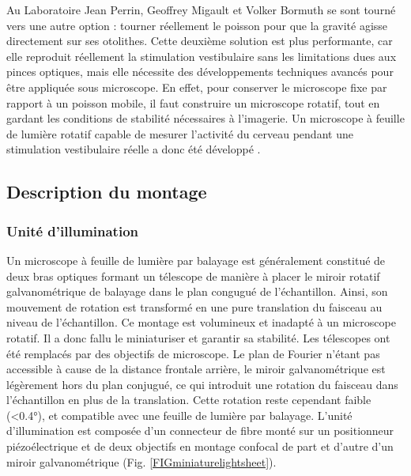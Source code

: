 Au Laboratoire Jean Perrin, Geoffrey Migault et Volker Bormuth se sont tourné vers une autre option : tourner réellement le poisson pour que la gravité agisse directement sur ses otolithes.
Cette deuxième solution est plus performante, car elle reproduit réellement la stimulation vestibulaire sans les limitations dues aux pinces optiques, mais elle nécessite des développements techniques avancés pour être appliquée sous microscope. En effet, pour conserver le microscope fixe par rapport à un poisson mobile, il faut construire un microscope rotatif, tout en gardant les conditions de stabilité nécessaires à l'imagerie. Un microscope à feuille de lumière rotatif capable de mesurer l'activité du cerveau pendant une stimulation vestibulaire réelle a donc été développé \cite{migault_whole-brain_2018}.

\subsection{Description du montage}

\subsubsection{Unité d'illumination}

Un microscope à feuille de lumière par balayage est généralement constitué de deux bras optiques formant un télescope de manière à placer le miroir rotatif galvanométrique de balayage dans le plan congugué de l'échantillon. Ainsi, son mouvement de rotation est transformé en une pure translation du faisceau au niveau de l'échantillon. Ce montage est volumineux et inadapté à un microscope rotatif. Il a donc fallu le miniaturiser et garantir sa stabilité. Les télescopes ont été remplacés par des objectifs de microscope. Le plan de Fourier n'étant pas accessible à cause de la distance frontale arrière, le miroir galvanométrique est légèrement hors du plan conjugué, ce qui introduit une rotation du faisceau dans l'échantillon en plus de la translation. Cette rotation reste cependant faible (<0.4°), et compatible avec une feuille de lumière par balayage.  
L'unité d'illumination est composée d'un connecteur de fibre monté sur un positionneur piézoélectrique et de deux objectifs en montage confocal de part et d'autre d'un miroir galvanométrique (Fig. \ref{FIGminiaturelightsheet}).

